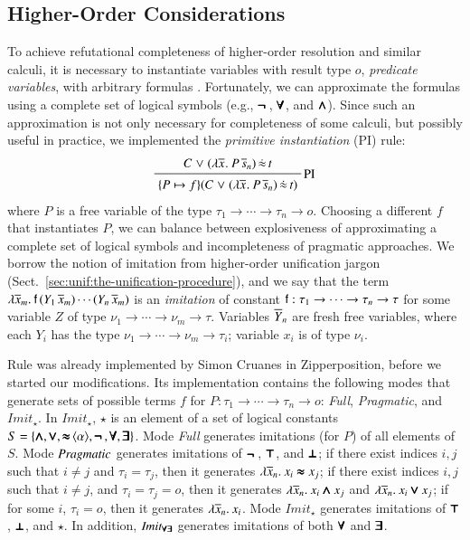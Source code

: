 \subsection{Higher-Order Considerations}
\label{subsect:bool:core}
To achieve refutational completeness of higher-order resolution and similar
calculi, it is necessary to instantiate variables with result type $o$,
\emph{predicate variables}, with arbitrary formulas
\cite{as-18-phd,pa-01-classical-ty-thy}. Fortunately, we can approximate the
formulas using a complete set of logical symbols (e.g., $\pmb{\neg\,}$, $\pmb{\forall}$, and
$\pmb{\land}$). Since such an approximation is not only necessary for completeness of
some calculi, but possibly useful in practice, we implemented the \emph{primitive
instantiation} (PI) rule:
%
$$ \namedinference{PI} {C \llor (\lam{\tuple{x}{}}{P \, \tuplen{s}}) \, \dot{\eq}
\, t} {\substcl{\{ P
\mapsto f \}}{C \llor (\lam{\tuple{x}{}}{P \, \tuplen{s}}) \, \dot{\eq} \, t}  } $$
%
where $P$ is a free variable of
the type $\tau_1 \rightarrow \cdots \rightarrow \tau_n \rightarrow o$. 
Choosing a different $f$ that instantiates $P$, we can balance between
explosiveness of approximating a complete set of logical symbols and
incompleteness of pragmatic approaches. We borrow the notion of imitation from
higher-order unification jargon (Sect.~\ref{sec:unif:the-unification-procedure}), and we say
that the term $\lambda \overline{x}_{m}.\> \mathsf{f} \, (Y_1 \, \overline{x}_{m}) \cdots (Y_n
\, \overline{x}_{m}) $ is an \emph{imitation} of constant $\mathsf{f} : \tau_1
\rightarrow \cdots \rightarrow \tau_n \rightarrow \tau$ for some variable $Z$ of type $\nu_1
\rightarrow \cdots \rightarrow \nu_m \rightarrow \tau$. Variables $\overline{Y}_{n}$
are fresh free variables, where each $Y_i$ has the type $\nu_1 \rightarrow
\cdots \rightarrow \nu_m \rightarrow \tau_i$; variable $x_i$ is of type $\nu_i$.
\pagebreak[2]

Rule  was already implemented by Simon Cruanes in Zipperposition,
before we started our modifications. Its implementation contains the following modes that generate
sets of possible terms $f$ for $P: \tau_1 \rightarrow \cdots \rightarrow \tau_n
\rightarrow o$: \emph{Full}, \emph{Pragmatic}, and $\mathit{Imit}_{\star}$. In  $\mathit{Imit}_{\star}$,
$\star$ is an element of a set of logical constants $S = \{ \pmb{\land}, \pmb{\lor},
\mathop{\pmb{\approx}}{\langle\alpha\rangle}, \pmb{\neg\,}, \pmb{\forall}, \pmb{\exists} \}$. Mode \emph{Full}
generates imitations (for $P$) of all elements of $S$. Mode $\emph{Pragmatic}$
generates imitations of $\pmb{\neg\,}$, $\pmb{\top}$, and $\pmb{\bot}$; if there exist indices $i,j$
such that $i\not= j$ and  $\tau_i = \tau_j$, then it generates $\lambda \overline{x}_{n}.\> x_i
\pmb{\approx} x_j$; if there exist indices $i,j$ such that $i \not= j$, and $\tau_i =
\tau_j = o$, then it generates $\lambda \overline{x}_{n}.\> x_i \pmb{\land} x_j$ and
$\lambda \overline{x}_{n}.\> x_i \pmb{\lor} x_j$; if for some $i$, $\tau_i = o$, then it
generates $\lambda \overline{x}_{n}.\> x_i$. Mode $\mathit{Imit}_\star$ generates
imitations of $\pmb{\top}$, $\pmb{\bot}$, and $\star$. In addition, $\mathit{Imit_{\pmb{\forall}\pmb{\exists}}}$ generates imitations
of both $\pmb{\forall}$ and $\pmb{\exists}$.


